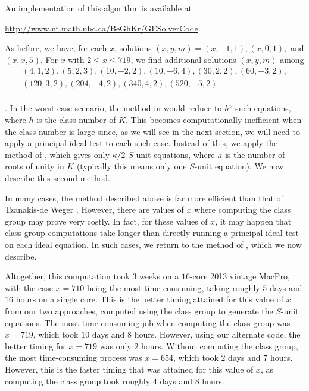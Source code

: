 %

An implementation of this algorithm is available at
\begin{center}
\url{http://www.nt.math.ubc.ca/BeGhKr/GESolverCode}.
\end{center}

As before, we have, for each $x$, solutions $(x,y,m) = (x,-1,1), (x,0,1),$ and $(x,x,5)$. For $x$ with $2 \leq x \leq 719$, we find additional solutions $(x,y,m)$ among 
$$
\begin{array}{c}
(4,1,2), (5,2,3), (10,-2,2), (10,-6,4), (30,2,2), (60,-3,2), \\
(120, 3,2), (204,-4,2), (340, 4,2), (520,-5,2).\\
\end{array}
$$



. In the worst case scenario, the method in \cite{TW3} would reduce to $h^v$ such equations, where $h$ is the class number of $K$. This becomes computationally inefficient when the class number is large since, as we will see in the next section, we will need to apply a principal ideal test to each such case. Instead of this, we apply the method of \cite{GhKaMaSi}, which gives only $\kappa/2$ $S$-unit equations, where $\kappa$ is the number of roots of unity in $K$ (typically this means only one $S$-unit equation). We now describe this second method. 

In many cases, the method described above is far more efficient than that of Tzanakis-de Weger \cite{TW3}. However, there are values of $x$ where computing the class group may prove very costly. In fact, for these values of $x$, it may happen that class group computations  take longer than directly running a  principal ideal test on each ideal equation. In such cases, we return to the method of \cite{TW3}, which we now describe. 

Altogether, this computation took 3 weeks on a $16$-core 2013 vintage MacPro, with the case $x=710$ being the most time-consuming, taking roughly $5$ days and $16$ hours on a single core. This is the better timing attained for this value of $x$ from our two approaches, computed using the class group to generate the $S$-unit equations. The most time-consuming job when computing the class group was $x = 719$, which took $10$ days and $8$ hours. However, using our alternate code, the better timing for $x = 719$ was only $2$ hours. Without computing the class group, the most time-consuming process was $x = 654$, which took $2$ days and $7$ hours. However, this is the faster timing that was attained for this value of $x$, as computing the class group took roughly $4$ days and $8$ hours. 

